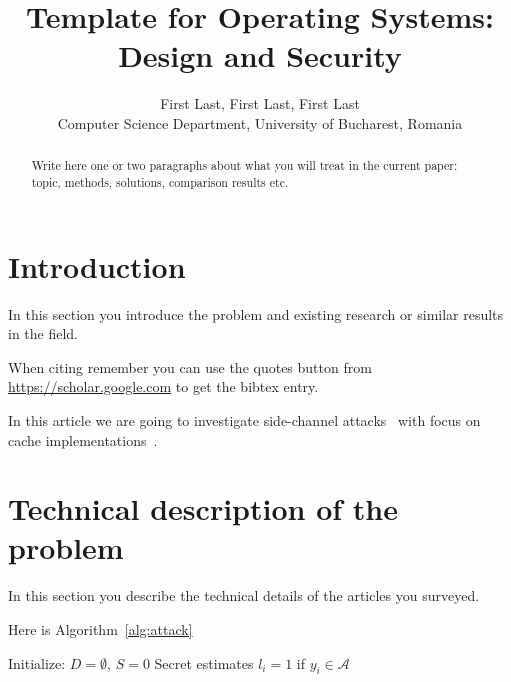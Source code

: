 \documentclass[a4paper,10pt,twocolumn,english]{article}
\title{Template for Operating Systems: Design and Security}
\author{
    First Last, 
    First Last,
    First Last\\
	\footnotesize Computer Science Department, University of Bucharest, Romania
}
\date{\empty} %
\begin{document}
\maketitle
\begin{abstract} 
Write here one or two paragraphs about what you will treat in the current paper:
topic,
methods,
solutions,
comparison results etc.
\end{abstract}
\section{Introduction}

In this section you introduce the problem and existing research or similar results in the field.

When citing remember you can use the quotes button from \url{https://scholar.google.com} to get the bibtex entry.

In this article we are going to investigate side-channel attacks~\cite{kocher96_timing}
with focus on cache implementations~\cite{lipp18_meltdown}.

\section{Technical description of the problem}

In this section you describe the technical details of the articles you surveyed.

Here is Algorithm~\ref{alg:attack}
\begin{algorithm}[t]
	\caption{Attack Algorithm}
	\label{alg:attack} 	
	\DontPrintSemicolon
	\medskip

	\medskip

	Initialize: $D = \emptyset $, $S = 0$ \;
	Secret estimates $l_i = 1$ if $y_i  \in \mathcal{A}$
\end{algorithm}

\end{document}
